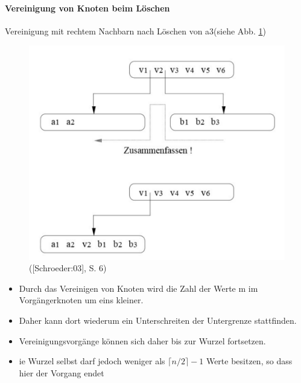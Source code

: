 \paragraph{Vereinigung von Knoten beim L\"oschen} 

Vereinigung mit rechtem Nachbarn nach L\"oschen von a3(siehe Abb. \ref{loeschen_01})
\begin{figure}[h!] %
	\centering
	\includegraphics[width=0.7\linewidth]{images/loeschen_01}
	\caption{([Schroeder:03], S. 6)}
	\label{loeschen_01}
\end{figure}
\begin{itemize}
	\item Durch das Vereinigen von Knoten wird die Zahl der Werte m im Vorg\"angerknoten um eins kleiner.
	\item Daher kann dort wiederum ein Unterschreiten der Untergrenze stattfinden.
	\item Vereinigungsvorg\"ange k\"onnen sich daher bis zur Wurzel fortsetzen.
	\item ie Wurzel selbst darf jedoch weniger als $\lceil n/2\rceil -1$ Werte besitzen, so dass hier der Vorgang endet
	
\end{itemize}